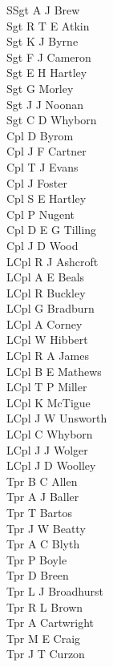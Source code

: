 \begin{multicols}{3}
  \small
  \noindent
  SSgt A J Brew \\
  Sgt R T E Atkin \\
  Sgt K J Byrne \\
  Sgt F J Cameron \\
  Sgt E H Hartley \\
  Sgt G Morley \\
  Sgt J J Noonan \\
  Sgt C D Whyborn \\
  Cpl D Byrom \\
  Cpl J F Cartner \\
  Cpl T J Evans \\
  Cpl J Foster \\
  Cpl S E Hartley \\
  Cpl P Nugent \\
  Cpl D E G Tilling \\
  Cpl J D Wood \\
  LCpl R J Ashcroft \\
  LCpl A E Beals \\
  LCpl R Buckley \\
  LCpl G Bradburn \\
  LCpl A Corney \\
  LCpl W Hibbert \\
  LCpl R A James \\
  LCpl B E Mathews \\
  LCpl T P Miller \\
  LCpl K McTigue \\
  LCpl J W Unsworth \\
  LCpl C Whyborn \\
  LCpl J J Wolger \\
  LCpl J D Woolley \\
  Tpr B C Allen \\
  Tpr A J Baller \\
  Tpr T Bartos \\
  Tpr J W Beatty \\
  Tpr A C Blyth \\
  Tpr P Boyle \\
  Tpr D Breen \\
  Tpr L J Broadhurst \\
  Tpr R L Brown \\
  Tpr A Cartwright \\
  Tpr M E Craig \\
  Tpr J T Curzon \\

\end{multicols}

